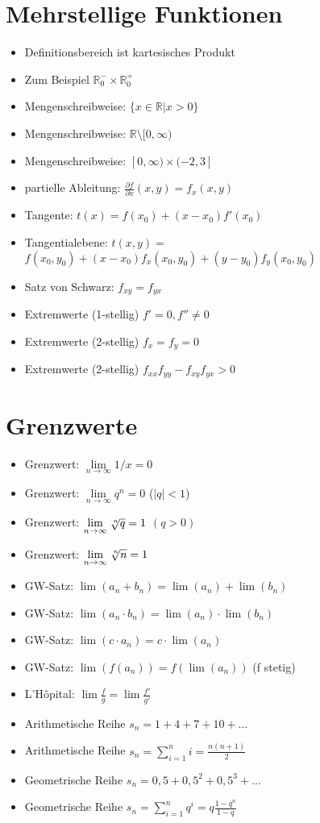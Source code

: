 \documentclass[a4paper,10pt]{article}
\begin{document}
\begin{multicols}{2}


\section {Mehrstellige Funktionen}
\begin{itemize}
\item Definitionsbereich ist kartesisches Produkt
\item Zum Beispiel $\mathbb{R}_0^{-} \times \mathbb{R}_0^{+}$
\item Mengenschreibweise: $\{ x \in \mathbb{R} | x > 0\}$
\item Mengenschreibweise: $\mathbb{R}\setminus[0,\infty)$
\item Mengenschreibweise: $[0,\infty) \times (-2,3]$
\item partielle Ableitung: $\frac{\partial f}{\partial x}(x,y) = f_x(x,y)$
\item Tangente: $t(x) = f(x_0) + (x-x_0)f'(x_0)$
\item Tangentialebene: $t(x,y) = $ \\
$f(x_0,y_0) + (x-x_0)f_x(x_0,y_0) + (y-y_0)f_y(x_0,y_0)$
\item Satz von Schwarz: $f_{xy} = f_{yx}$
\item Extremwerte (1-stellig) $f' = 0, f'' \ne 0$
\item Extremwerte (2-stellig) $f_x = f_y = 0$
\item Extremwerte (2-stellig) $f_{xx} f_{yy} - f_{xy}f_{yx} > 0$
\end{itemize}

\section {Grenzwerte}
\begin{itemize}
\item Grenzwert: $\lim\limits_{n \to \infty} 1/x = 0$
\item Grenzwert: $\lim\limits_{n \to \infty} q^n = 0$ ($|q| < 1$)
\item Grenzwert: $\lim\limits_{n \to \infty} \sqrt[\leftroot{-2}\uproot{2}n]{q} = 1$ $(q > 0)$
\item Grenzwert: $\lim\limits_{n \to \infty} \sqrt[\leftroot{-2}\uproot{2}n]{n} = 1$
\item GW-Satz: $\lim (a_n+b_n) = \lim (a_n) + \lim (b_n)$
\item GW-Satz: $\lim (a_n\cdot b_n) = \lim(a_n) \cdot \lim(b_n)$
\item GW-Satz: $\lim (c\cdot a_n) = c \cdot \lim(a_n)$
\item GW-Satz: $\lim (f(a_n)) = f(\lim(a_n))$ (f stetig)
\item L'Hôpital: $\lim \frac{f}{g} = \lim \frac{f'}{g'}$
\item Arithmetische Reihe $s_n = 1 + 4 + 7 + 10 + ...$
\item Arithmetische Reihe $s_n = \sum_{i=1}^n{i} = \frac{n(n+1)}{2}$
\item Geometrische Reihe $s_n = 0{,}5 + 0{,}5^2 + 0{,}5^3 + ...$
\item Geometrische Reihe $s_n = \sum_{i=1}^n q^i = q\frac{1-q^n}{1-q}$
\end{itemize}


\end{multicols}
\end{document}
